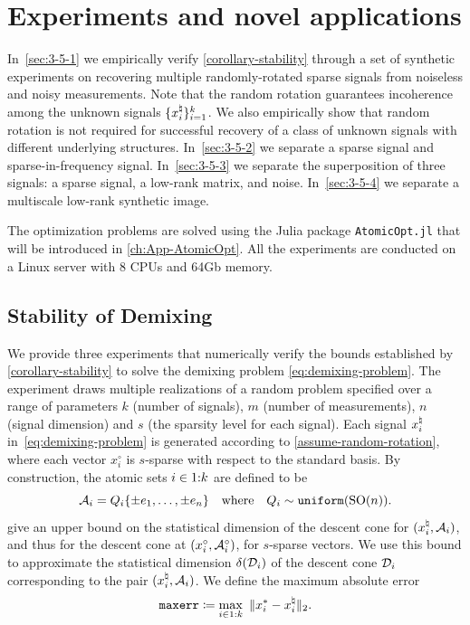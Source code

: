 \section{Experiments and novel applications} \label{sec:3-5}

In~\autoref{sec:3-5-1} we empirically verify \autoref{corollary-stability} through a set of synthetic experiments on recovering multiple randomly-rotated sparse signals from noiseless and noisy measurements. Note that the random rotation guarantees incoherence among the unknown signals $\{x_i^{\natural}\}_{i=1}^k$. We also empirically show that random rotation is not required for successful recovery of a class of unknown signals with different underlying structures. In~\autoref{sec:3-5-2} we separate a sparse signal and sparse-in-frequency signal. In~\autoref{sec:3-5-3} we separate the superposition of three signals: a sparse signal, a low-rank matrix, and noise. In~\autoref{sec:3-5-4} we separate a multiscale low-rank synthetic image.

The optimization problems are solved using the Julia package \texttt{AtomicOpt.jl} that will be introduced in \autoref{ch:App-AtomicOpt}. All the experiments are conducted on a Linux server with 8 CPUs and 64Gb memory.

\subsection{Stability of Demixing} \label{sec:3-5-1}

We provide three experiments that numerically verify the bounds established by \autoref{corollary-stability} to solve the demixing problem \eqref{eq:demixing-problem}. The experiment draws multiple realizations of a random problem specified over a range of parameters $k$ (number of signals), $m$ (number of measurements), $n$ (signal dimension) and $s$ (the sparsity level for each signal). Each signal $x_i^{\natural}$ in~\eqref{eq:demixing-problem} is generated according to \autoref{assume-random-rotation}, where each vector $x_i^\circ$ is $s$-sparse with respect to the standard basis. By construction, the atomic sets $i\in1\mathord{:}k$ are defined to be 
\[
  \mathcal{A}_i = Q_i \{\pm e_1, \dots, \pm e_n\}\hbox{\quad where\quad} Q_i\sim\operatorname{\texttt{uniform}}(\operatorname{SO}(n)).
\]
\citet[Proposition~4.5]{amelunxen2014living} give an upper bound on the statistical dimension of the descent cone for $(x_i^{\natural},\mathcal{A}_i)$, and thus for the descent cone at $(x_i^\circ,\mathcal{A}_i^\circ)$, for  $s$-sparse vectors. We use this bound to approximate the statistical dimension $\delta(\mathcal{D}_i)$ of the descent cone $\mathcal{D}_i$ corresponding to the pair $(x_i^{\natural},\mathcal{A}_i)$.  We define the maximum absolute error
\begin{equation} \label{eq:rela_diff}
  \mathop{\tt maxerr}\coloneqq \max_{i\in\irange1k}\ \twonorm{x_i^*-x\nai}.
\end{equation}

